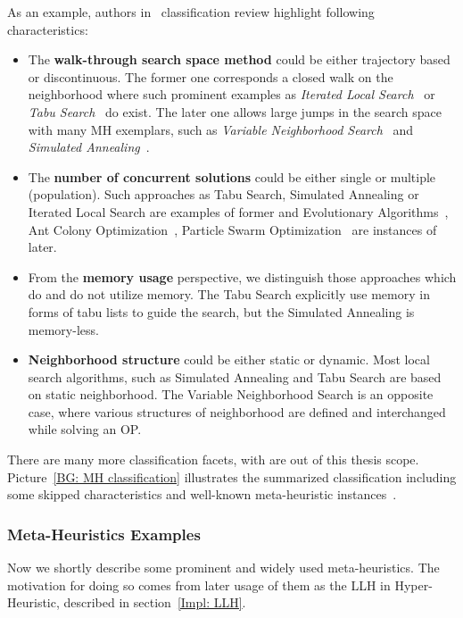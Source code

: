 As an example, authors in~\cite{birattari2001classification} classification review highlight following characteristics:
\begin{itemize}[itemsep=8pt]
	\item The \textbf{walk-through search space method} could be either trajectory based or discontinuous. The former one corresponds a closed walk on the neighborhood where such prominent examples as \textit{Iterated Local Search}~\cite{lourencco2003iterated} or \textit{Tabu Search}~\cite{glover1989tabu} do exist. The later one allows large jumps in the search space with many MH exemplars, such as \textit{Variable Neighborhood Search}~\cite{hansen2003variable} and \textit{Simulated Annealing}~\cite{kirkpatrick1983optimization}.
	
	\item The \textbf{number of concurrent solutions} could be either single or multiple (population). Such approaches as Tabu Search, Simulated Annealing or Iterated Local Search are examples of former and Evolutionary Algorithms~\cite{eiben2015evolutionary}, Ant Colony Optimization~\cite{dorigo2007ant}, Particle Swarm Optimization~\cite{kennedy1995particle} are instances of later.
	
	\item From the \textbf{memory usage} perspective, we distinguish those approaches which do and do not utilize memory. The Tabu Search explicitly use memory in forms of tabu lists to guide the search, but the Simulated Annealing is memory-less.
	
	\item \textbf{Neighborhood structure} could be either static or dynamic. Most local search algorithms, such as Simulated Annealing and Tabu Search are based on static neighborhood. The Variable Neighborhood Search is an opposite case, where various structures of neighborhood are defined and interchanged while solving an OP. 
\end{itemize}

There are many more classification facets, with are out of this thesis scope. Picture~\ref{BG: MH classification} illustrates the summarized classification including some skipped characteristics and well-known meta-heuristic instances~\cite{wiki_MH_classification}.


\subsubsection{Meta-Heuristics Examples}\label{BG: MH Examples}
Now we shortly describe some prominent and widely used meta-heuristics. The motivation for doing so comes from later usage of them as the LLH in Hyper-Heuristic, described in section~\ref{Impl: LLH}.

